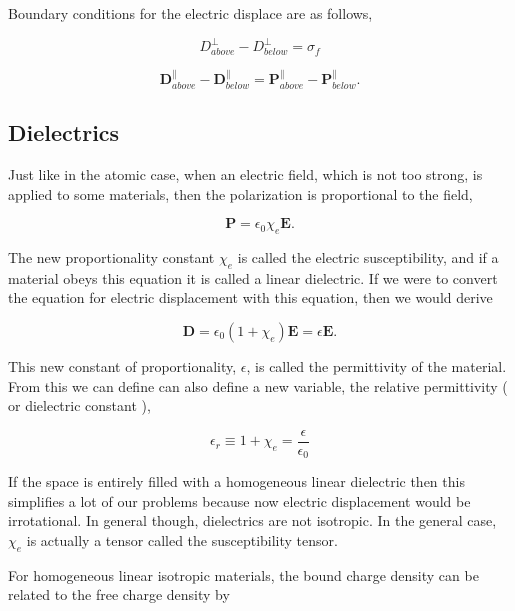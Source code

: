 \documentclass[preprint, review,12pt]{elsarticle}
\def\b{\textbf}
\begin{document}
Boundary conditions for the electric displace are as follows,

\begin{equation}
    D_{above}^\bot - D_{below}^\bot = \sigma_f
\end{equation}

\begin{equation}
    \b{D}_{above}^\parallel - \b{D}_{below}^\parallel = \b{P}_{above}^\parallel - \b{P}_{below}^\parallel.
\end{equation}

\subsection{Dielectrics}

Just like in the atomic case, when an electric field, which is not too strong, is applied to some materials, then the polarization is proportional to the field,

\begin{equation}
    \b{P} = \epsilon_0 \chi_e \b{E}.
\end{equation}

The new proportionality constant $\chi_e$ is called the electric susceptibility, and if a material obeys this equation it is called a linear dielectric. If we were to convert the equation for electric displacement with this equation, then we would derive 

\begin{equation}
    \b{D} = \epsilon_0 (1+\chi_e)\b{E} = \epsilon \b{E}.
\end{equation}

This new constant of proportionality, $\epsilon$, is called the permittivity of the material. From this we can define can also define a new variable, the relative permittivity ( or dielectric constant ), 

\begin{equation}
    \epsilon_r \equiv 1 + \chi_e = \frac{\epsilon}{\epsilon_0}
\end{equation}

If the space is entirely filled with a homogeneous linear dielectric then this simplifies a lot of our problems because now electric displacement would be irrotational. In general though, dielectrics are not isotropic. In the general case, $\chi_e$ is actually a tensor called the susceptibility tensor. 

For homogeneous linear isotropic materials, the bound charge density can be related to the free charge density by
\end{document}
